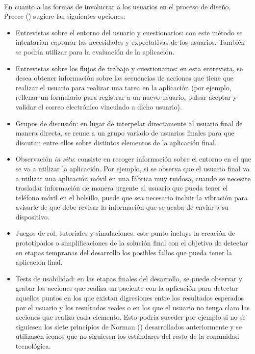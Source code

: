 \paragraph{}
En cuanto a las formas de involucrar a los usuarios en el proceso de diseño, Preece (\citeyear{rogers2011interaction}) sugiere las siguientes opciones:
\begin{itemize}
    \item Entrevistas sobre el entorno del usuario y cuestionarios: con este método se intentarían capturar las necesidades y expectativas de los usuarios. También se podría utilizar para la evaluación de la aplicación.
    \item Entrevistas sobre los flujos de trabajo y cuestionarios: en esta entrevista, se desea obtener información sobre las secuencias de acciones que tiene que realizar el usuario para realizar una tarea en la aplicación (por ejemplo, rellenar un formulario para registrar a un nuevo usuario, pulsar aceptar y validar el correo electrónico vinculado a dicho usuario).
    \item Grupos de discusión: en lugar de interpelar directamente al usuario final de manera directa, se reune a un grupo variado de usuarios finales para que discutan entre ellos sobre distintos elementos de la aplicación final.
    \item Observación \textit{in situ}: consiste en recoger información sobre el entorno en el que se va a utilizar la aplicación. Por ejemplo, si se observa que el usuario final va a utilizar una aplicación móvil en una fábrica muy ruidosa, cuando se necesite trasladar información de manera urgente al usuario que pueda tener el teléfono móvil en el bolsillo, puede que sea necesario incluir la vibración para avisarle de que debe revisar la información que se acaba de enviar a su dispositivo.
    \item Juegos de rol, tutoriales y simulaciones: este punto incluye la creación de prototipados o simplificaciones de la solución final con el objetivo de detectar en etapas tempranas del desarrollo los posibles fallos que pueda tener la aplicación final.
    \item Tests de usabilidad: en las etapas finales del desarrollo, se puede observar y grabar las acciones que realiza un paciente con la aplicación para detectar aquellos puntos en los que existan digresiones entre los resultados esperados por el usuario y los resultados reales o en los que el usuario no tenga claro las acciones que realiza cada elemento. Esto podría suceder por ejemplo si no se siguiesen los siete principios de Norman (\citeyear{norman1986user}) desarrollados anteriormente y se utilizasen iconos que no siguiesen los estándares del resto de la comunidad tecnológica.
\end{itemize}

